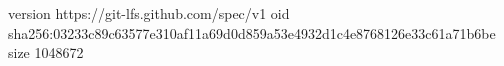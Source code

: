 version https://git-lfs.github.com/spec/v1
oid sha256:03233c89c63577e310af11a69d0d859a53e4932d1c4e8768126e33c61a71b6be
size 1048672

